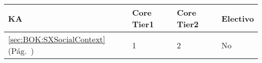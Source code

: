 \begin{center}
\begin{tabularx}{\textwidth}{|X|p{1cm}|p{1cm}|p{1.4cm}|}\hline
\textbf{\acf{KA}} & \textbf{Core Tier1} & \textbf{Core Tier2} & \textbf{Electivo} \\ \hline
\ref{sec:BOK:SXSocialContext} \htmlref{\SXSocialContext}{sec:BOK:SXSocialContext}\xspace (Pág.~\pageref{sec:BOK:SXSocialContext}) & 1 & 2 & No \\ \hline
\end{tabularx}
\end{center}
